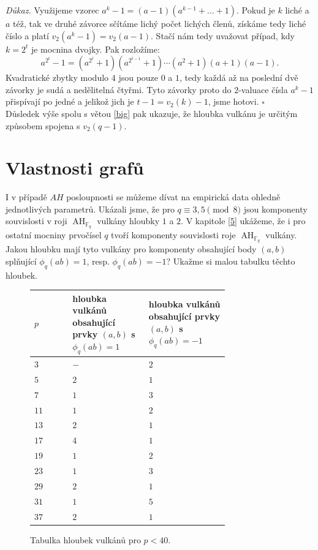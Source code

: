 \documentclass[12pt]{report}
\DeclareMathOperator{\AH}{AH}
\begin{document}
\noindent \textit{Důkaz.} Využijeme vzorec $a^k-1 = (a-1)(a^{k-1}+\dots+1)$. Pokud je $k$ liché a $a$ též, tak ve druhé závorce sčítáme lichý počet lichých členů, získáme tedy liché číslo a platí $v_2(a^k-1) = v_2(a-1)$. Stačí nám tedy uvažovat případ, kdy $ k= 2^t$ je mocnina dvojky. Pak rozložíme:
$$a^{2^t}-1 = (a^{2^t}+1)(a^{2^{t-1}}+1)\cdots(a^2+1)(a+1)(a-1).$$
Kvadratické zbytky modulo $4$ jsou pouze $0$ a $1$, tedy každá až na poslední dvě závorky je sudá a nedělitelná čtyřmi. Tyto závorky proto do $2$-valuace čísla $a^k-1$ přispívají po jedné a jelikož jich je $t-1 = v_2(k)-1$, jsme hotovi. \hfill $\square$\\

Důsledek výše spolu s větou \ref{big} pak ukazuje, že hloubka vulkánu je určitým způsobem spojena s $v_2 (q-1)$.

\section{Vlastnosti grafů}

I v případě $AH$ posloupnosti se můžeme dívat na empirická data ohledně jednotlivých parametrů. Ukázali jsme, že pro $q \equiv 3,5 \pmod{8}$ jsou komponenty souvislosti v roji $\AH_{\mathbb{F}_q}$ vulkány hloubky $1$ a $2$. V kapitole \ref{5} ukážeme, že i pro ostatní mocniny prvočísel $q$ tvoří komponenty souvislosti roje $\AH_{\mathbb{F}_q}$ vulkány. Jakou hloubku mají tyto vulkány pro komponenty obsahující body $(a,b)$ splňující $\phi_q(ab)=1$, resp. $\phi_q(ab)=-1$? Ukažme si malou tabulku těchto hloubek.

\begin{figure}[h]
 \begin{longtable}[H]{>{\raggedright\arraybackslash}p{0.15\linewidth}p{0.3\linewidth}p{0.3\linewidth}}
\toprule
$p$ & hloubka vulkánů obsahující prvky $(a,b)$ s $\phi_q(ab)=1$ & hloubka vulkánů obsahující prvky $(a,b)$ s $\phi_q(ab)=-1$ \\
\midrule
$3$ & \noindent $-$ & \noindent $2$\\
$5$ & \noindent $2$ & \noindent $1$\\
$7$ & \noindent $1$ & \noindent $3$\\
$11$ & \noindent $1$ & \noindent $2$\\
$13$ & \noindent $2$ & \noindent $1$\\
$17$ & \noindent $4$ & \noindent $1$\\
$19$ & \noindent $1$ & \noindent $2$\\
$23$ & \noindent $1$ & \noindent $3$\\
$29$ & \noindent $2$ & \noindent $1$\\
$31$ & \noindent $1$ & \noindent $5$\\
$37$ & \noindent $2$ & \noindent $1$\\
\bottomrule 
\end{longtable}
\caption{Tabulka hloubek vulkánů pro $p < 40$.}
\end{figure}
\end{document}
